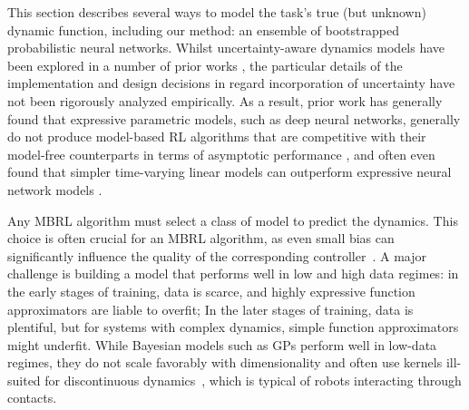 \begin{table}
  \vspace{-10pt}
  \centering
  \caption{Model uncertainties captured.}
  \label{table:modelclasses}
\end{table}
%
This section describes several ways to model the task's true (but unknown) dynamic function, including our method: an ensemble of bootstrapped probabilistic neural networks.
Whilst uncertainty-aware dynamics models have been explored in a number of prior works \citep{Gal2016,Depeweg2016}, the particular details of the implementation and design decisions in regard incorporation of uncertainty have not been rigorously analyzed empirically.
As a result, prior work has generally found that expressive parametric models, such as deep neural networks, generally do not produce model-based RL algorithms that are competitive with their model-free counterparts in terms of asymptotic performance \citep{Nagabandi2017}, and often even found that simpler time-varying linear models can outperform expressive neural network models \citep{Levine2016,gu2016continuous}. 

Any MBRL algorithm must select a class of model to predict the dynamics.
This choice is often crucial for an MBRL algorithm, as even small bias can significantly influence the quality of the corresponding controller~\citep{Atkeson1997,Abbeel2006}.
A major challenge is building a model that performs well in low and high data regimes: in the early stages of training, data is scarce, and highly expressive function approximators are liable to overfit;
In the later stages of training, data is plentiful, but for systems with complex dynamics, simple function approximators might underfit. 
While Bayesian models such as GPs perform well in low-data regimes, they do not scale favorably with dimensionality and often use kernels ill-suited for discontinuous dynamics~\citep{Calandra2016a}, which is typical of robots interacting through contacts.

